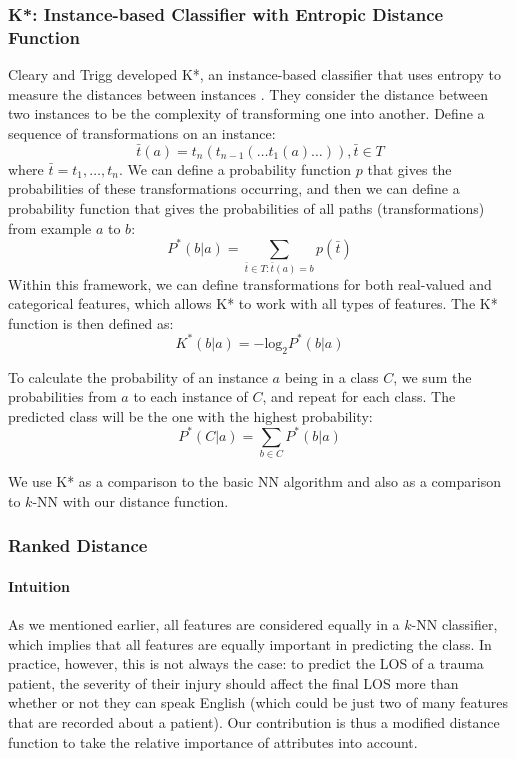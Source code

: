 \subsubsection{K*: Instance-based Classifier with Entropic Distance Function}
Cleary and Trigg developed K*, an instance-based classifier that uses entropy
to measure the distances between instances \cite{Cleary1995}. They consider
the distance between two instances to be the complexity of transforming one
into another. Define a sequence of transformations on an instance:
\begin{equation*}
\bar{t}(a) = t_n(t_{n-1}(\ldots t_1(a)\ldots)), \bar{t} \in T
\end{equation*}
where $\bar{t} = t_1,\ldots,t_n$. We can define a probability function $p$
that gives the probabilities of these transformations occurring, and then we
can define a probability function that gives the probabilities of all paths
(transformations) from example $a$ to $b$:
\begin{equation*}
P^*(b|a) = \sum_{\bar{t}\in T:\bar{t}(a)=b} p(\bar{t})
\end{equation*}
Within this framework, we can define transformations for both real-valued and
categorical features, which allows K* to work with all types of features.
The K* function is then defined as:
\begin{equation*}
K^*(b|a) = -\mathrm{log}_2P^*(b|a)
\end{equation*}

To calculate the probability of an instance $a$ being in a class $C$, we sum
the probabilities from $a$ to each instance of $C$, and repeat for each class.
The predicted class will be the one with the highest probability:
\begin{equation*}
P^*(C|a) = \sum_{b\in C} P^*(b|a)
\end{equation*}

We use K* as a comparison to the basic NN algorithm and also as a comparison
to $k$-NN with our distance function.

\subsubsection{Ranked Distance}
\paragraph{Intuition}
As we mentioned earlier, all features are considered equally in a $k$-NN
classifier, which implies that all features are equally important in predicting
the class. In practice, however, this is not always the case: to predict the
LOS of a trauma patient, the severity of their injury should affect the final
LOS more than whether or not they can speak English (which could be just two
of many features that are recorded about a patient). Our contribution is thus
a modified distance function to take the relative importance of attributes into
account. 

